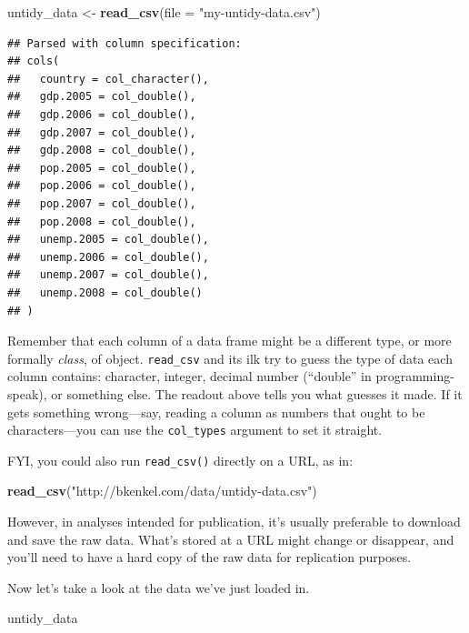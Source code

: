 \documentclass[
  12pt,
  oneside,openany]{book}
\newenvironment{Shaded}{\begin{snugshade}}{\end{snugshade}}
\newcommand{\DataTypeTok}[1]{\textcolor[rgb]{0.13,0.29,0.53}{#1}}
\newcommand{\KeywordTok}[1]{\textcolor[rgb]{0.13,0.29,0.53}{\textbf{#1}}}
\newcommand{\NormalTok}[1]{#1}
\newcommand{\StringTok}[1]{\textcolor[rgb]{0.31,0.60,0.02}{#1}}
\begin{document}
\begin{Shaded}
\begin{Highlighting}[]
\NormalTok{untidy\_data <{-}}\StringTok{ }\KeywordTok{read\_csv}\NormalTok{(}\DataTypeTok{file =} \StringTok{"my{-}untidy{-}data.csv"}\NormalTok{)}
\end{Highlighting}
\end{Shaded}

\begin{verbatim}
## Parsed with column specification:
## cols(
##   country = col_character(),
##   gdp.2005 = col_double(),
##   gdp.2006 = col_double(),
##   gdp.2007 = col_double(),
##   gdp.2008 = col_double(),
##   pop.2005 = col_double(),
##   pop.2006 = col_double(),
##   pop.2007 = col_double(),
##   pop.2008 = col_double(),
##   unemp.2005 = col_double(),
##   unemp.2006 = col_double(),
##   unemp.2007 = col_double(),
##   unemp.2008 = col_double()
## )
\end{verbatim}

Remember that each column of a data frame might be a different type, or more formally \emph{class}, of object. \texttt{read\_csv} and its ilk try to guess the type of data each column contains: character, integer, decimal number (``double'' in programming-speak), or something else. The readout above tells you what guesses it made. If it gets something wrong---say, reading a column as numbers that ought to be characters---you can use the \texttt{col\_types} argument to set it straight.

FYI, you could also run \texttt{read\_csv()} directly on a URL, as in:

\begin{Shaded}
\begin{Highlighting}[]
\KeywordTok{read\_csv}\NormalTok{(}\StringTok{"http://bkenkel.com/data/untidy{-}data.csv"}\NormalTok{)}
\end{Highlighting}
\end{Shaded}

However, in analyses intended for publication, it's usually preferable to download and save the raw data. What's stored at a URL might change or disappear, and you'll need to have a hard copy of the raw data for replication purposes.

Now let's take a look at the data we've just loaded in.

\begin{Shaded}
\begin{Highlighting}[]
\NormalTok{untidy\_data}
\end{Highlighting}
\end{Shaded}
\end{document}
